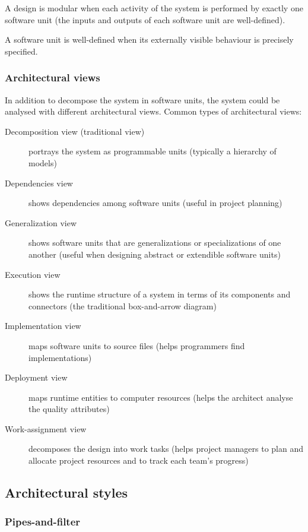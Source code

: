 A design is modular when each activity of the system is performed by exactly one
software unit (the inputs and outputs of each software unit are well-defined).

A software unit is well-defined when its externally visible behaviour is
precisely specified.

\subsubsection{Architectural views}

In addition to decompose the system in software units, the system could be
analysed with different architectural views. Common types of architectural views:

\begin{description}
    \item[Decomposition view (traditional view)] portrays the system as
    programmable units (typically a hierarchy of models)
    \item[Dependencies view] shows dependencies among software units (useful in
    project planning)
    \item[Generalization view] shows software units that are generalizations or
    specializations of one another (useful when designing abstract or extendible
    software units)
    \item[Execution view] shows the runtime structure of a system in terms of
    its components and connectors (the traditional box-and-arrow diagram)
    \item[Implementation view] maps software units to source files (helps
    programmers find implementations)
    \item[Deployment view] maps runtime entities to computer resources (helps
    the architect analyse the quality attributes)
    \item[Work-assignment view] decomposes the design into work tasks (helps
    project managers to plan and allocate project resources and to track each
    team's progress)
\end{description}


\subsection{Architectural styles}

\subsubsection{Pipes-and-filter}

